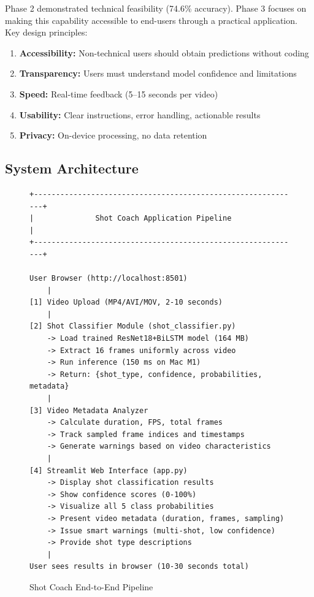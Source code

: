 \documentclass[11pt,a4paper]{article}
\begin{document}
Phase 2 demonstrated technical feasibility (74.6\% accuracy). Phase 3 focuses on making this capability accessible to end-users through a practical application. Key design principles:

\begin{enumerate}
\item \textbf{Accessibility:} Non-technical users should obtain predictions without coding
\item \textbf{Transparency:} Users must understand model confidence and limitations
\item \textbf{Speed:} Real-time feedback (5--15 seconds per video)
\item \textbf{Usability:} Clear instructions, error handling, actionable results
\item \textbf{Privacy:} On-device processing, no data retention
\end{enumerate}

\subsection{System Architecture}

\begin{figure}[H]
\centering
\begin{verbatim}
+-------------------------------------------------------------+
|              Shot Coach Application Pipeline                |
+-------------------------------------------------------------+

User Browser (http://localhost:8501)
    |
[1] Video Upload (MP4/AVI/MOV, 2-10 seconds)
    |
[2] Shot Classifier Module (shot_classifier.py)
    -> Load trained ResNet18+BiLSTM model (164 MB)
    -> Extract 16 frames uniformly across video
    -> Run inference (150 ms on Mac M1)
    -> Return: {shot_type, confidence, probabilities, metadata}
    |
[3] Video Metadata Analyzer
    -> Calculate duration, FPS, total frames
    -> Track sampled frame indices and timestamps
    -> Generate warnings based on video characteristics
    |
[4] Streamlit Web Interface (app.py)
    -> Display shot classification results
    -> Show confidence scores (0-100%)
    -> Visualize all 5 class probabilities
    -> Present video metadata (duration, frames, sampling)
    -> Issue smart warnings (multi-shot, low confidence)
    -> Provide shot type descriptions
    |
User sees results in browser (10-30 seconds total)
\end{verbatim}
\caption{Shot Coach End-to-End Pipeline}
\end{figure}
\end{document}
